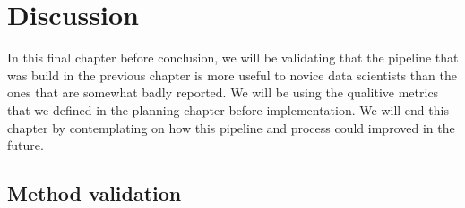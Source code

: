 \chapter{Discussion}
\label{chapter:evaluation}





In this final chapter before conclusion, we will be validating that the pipeline that was build in the previous chapter is more useful to novice data scientists than the ones that are somewhat badly reported.
We will be using the qualitive metrics that we defined in the planning chapter before implementation.
We will end this chapter by contemplating on how this pipeline and process could improved in the future.

\section{Method validation}

